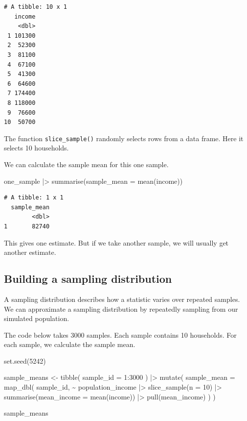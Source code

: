\documentclass[
  letterpaper,
  DIV=11,
  numbers=noendperiod]{scrreprt}
\newenvironment{Shaded}{\begin{snugshade}}{\end{snugshade}}
\newcommand{\AttributeTok}[1]{\textcolor[rgb]{0.40,0.45,0.13}{#1}}
\newcommand{\DecValTok}[1]{\textcolor[rgb]{0.68,0.00,0.00}{#1}}
\newcommand{\FunctionTok}[1]{\textcolor[rgb]{0.28,0.35,0.67}{#1}}
\newcommand{\NormalTok}[1]{\textcolor[rgb]{0.00,0.23,0.31}{#1}}
\newcommand{\OtherTok}[1]{\textcolor[rgb]{0.00,0.23,0.31}{#1}}
\newcommand{\SpecialCharTok}[1]{\textcolor[rgb]{0.37,0.37,0.37}{#1}}
\begin{document}
\begin{verbatim}
# A tibble: 10 x 1
   income
    <dbl>
 1 101300
 2  52300
 3  81100
 4  67100
 5  41300
 6  64600
 7 174400
 8 118000
 9  76600
10  50700
\end{verbatim}

The function \texttt{slice\_sample()} randomly selects rows from a data
frame. Here it selects 10 households.

We can calculate the sample mean for this one sample.

\begin{Shaded}
\begin{Highlighting}[]
\NormalTok{one\_sample }\SpecialCharTok{|\textgreater{}}
  \FunctionTok{summarise}\NormalTok{(}\AttributeTok{sample\_mean =} \FunctionTok{mean}\NormalTok{(income))}
\end{Highlighting}
\end{Shaded}

\begin{verbatim}
# A tibble: 1 x 1
  sample_mean
        <dbl>
1       82740
\end{verbatim}

This gives one estimate. But if we take another sample, we will usually
get another estimate.

\subsection{Building a sampling
distribution}\label{building-a-sampling-distribution}

A sampling distribution describes how a statistic varies over repeated
samples. We can approximate a sampling distribution by repeatedly
sampling from our simulated population.

The code below takes 3000 samples. Each sample contains 10 households.
For each sample, we calculate the sample mean.

\begin{Shaded}
\begin{Highlighting}[]
\FunctionTok{set.seed}\NormalTok{(}\DecValTok{5242}\NormalTok{)}

\NormalTok{sample\_means }\OtherTok{\textless{}{-}} \FunctionTok{tibble}\NormalTok{(}
  \AttributeTok{sample\_id =} \DecValTok{1}\SpecialCharTok{:}\DecValTok{3000}
\NormalTok{) }\SpecialCharTok{|\textgreater{}}
  \FunctionTok{mutate}\NormalTok{(}
    \AttributeTok{sample\_mean =} \FunctionTok{map\_dbl}\NormalTok{(}
\NormalTok{      sample\_id,}
      \SpecialCharTok{\textasciitilde{}}\NormalTok{ population\_income }\SpecialCharTok{|\textgreater{}}
        \FunctionTok{slice\_sample}\NormalTok{(}\AttributeTok{n =} \DecValTok{10}\NormalTok{) }\SpecialCharTok{|\textgreater{}}
        \FunctionTok{summarise}\NormalTok{(}\AttributeTok{mean\_income =} \FunctionTok{mean}\NormalTok{(income)) }\SpecialCharTok{|\textgreater{}}
        \FunctionTok{pull}\NormalTok{(mean\_income)}
\NormalTok{    )}
\NormalTok{  )}

\NormalTok{sample\_means}
\end{Highlighting}
\end{Shaded}
\end{document}
